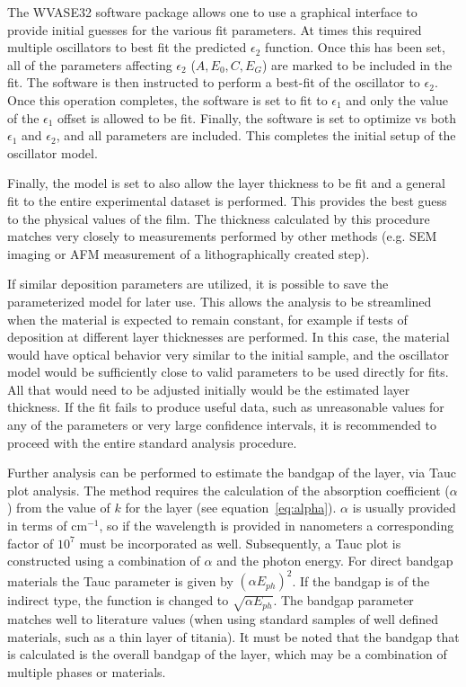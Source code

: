 \indent The WVASE32 software package allows one to use a graphical interface to provide initial guesses for the various fit parameters. At times this required multiple oscillators to best fit the predicted $\epsilon_{2}$ function. Once this has been set, all of the parameters affecting $\epsilon_{2}$ ($A, E_{0}, C, E_{G}$) are marked to be included in the fit. The software is then instructed to perform a best-fit of the oscillator to $\epsilon_{2}$. Once this operation completes, the software is set to fit to $\epsilon_{1}$ and only the value of the $\epsilon_{1}$ offset is allowed to be fit. Finally, the software is set to optimize vs both $\epsilon_{1}$ and $\epsilon_{2}$, and all parameters are included. This completes the initial setup of the oscillator model. 

Finally, the model is set to also allow the layer thickness to be fit and a general fit to the entire experimental dataset is performed. This provides the best guess to the physical values of the film. The thickness calculated by this procedure matches very closely to measurements performed by other methods (e.g. SEM imaging or AFM measurement of a lithographically created step). 

If similar deposition parameters are utilized, it is possible to save the parameterized model for later use. This allows the analysis to be streamlined when the material is expected to remain constant, for example if tests of deposition at different layer thicknesses are performed. In this case, the material would have optical behavior very similar to the initial sample, and the oscillator model would be sufficiently close to valid parameters to be used directly for fits. All that would need to be adjusted initially would be the estimated layer thickness. If the fit fails to produce useful data, such as unreasonable values for any of the parameters or very large confidence intervals, it is recommended to proceed with the entire standard analysis procedure. 

Further analysis can be performed to estimate the bandgap of the layer, via Tauc plot analysis.\cite{tauc_optical_1968,ablees_optical_1972,Bruzzese_2010} The method requires the calculation of the absorption coefficient ($\alpha$) from the value of $k$ for the layer (see equation~\vref{eq:alpha}). $\alpha$ is usually provided in terms of cm$^{-1}$, so if the wavelength is provided in nanometers a corresponding factor of $10^{7}$ must be incorporated as well. Subsequently, a Tauc plot is constructed using a combination of $\alpha$ and the photon energy. For direct bandgap materials the Tauc parameter is given by $\left(\alpha E_{ph}\right)^{2}$.\cite{tauc_optical_1968,ablees_optical_1972,Bruzzese_2010} If the bandgap is of the indirect type, the function is changed to $\sqrt{\alpha E_{ph}}$. The bandgap parameter matches well to literature values (when using standard samples of well defined materials, such as a thin layer of titania). It must be noted that the bandgap that is calculated is the overall bandgap of the layer, which may be a combination of multiple phases or materials.\cite{tauc_optical_1968,ablees_optical_1972,Bruzzese_2010}

